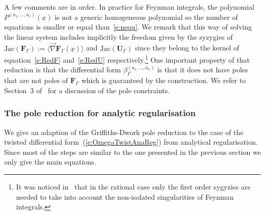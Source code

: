\documentclass[a4paper,12pt]{article}
\numberwithin{equation}{section}
\numberwithin{figure}{section}
\begin{document}
A few comments are in order. In practice for Feynman integrals,   the polynomial $ P^{(a_1,\dots,a_r)}(\underline x)$ is not a generic
homogeneous polynomial so the number of equations is smaller or equal than~\eqref{e:nequ}.
%
We remark that this way of solving the linear system includes implicitly the
freedom given by the syzygies of $\textrm{Jac}(\textbf{F}_\Gamma)
 :=\langle \vec\nabla \textbf{F}_\Gamma(\underline x)\rangle$ and
$\textrm{Jac}(\textbf{U}_\Gamma)$ since they belong to
the kernel of equation~\eqref{e:RedF} and~\eqref{e:RedU}
respectively.\footnote{It was noticed in~\cite{Lairez:2022zkj} that in
  the rational case only the first order sygyzies are needed to take
  into account the non-isolated singularities of Feynman integrals.}
%
%
%
One important property of that reduction is that the differential form $\beta_\Gamma^{(a_1,\dots,a_n)}$ is that it
does not have poles that are not poles of $\textbf{F}_\Gamma$ which is
guaranteed by the construction. We refer
to Section~3 of~\cite{Lairez:2022zkj} for a discussion of the pole constraints.
%
%
  \subsubsection{The pole reduction for analytic
    regularisation}\label{sec:PoleRedAn}
We give an adaption of the Griffiths-Dwork pole reduction to the case
of the twisted differential form~(\ref{e:OmegaTwistAnaReg})  from
analytical regularisation. Since most of the steps are similar to the
one presented in the previous section we only give the main equations.
\end{document}
